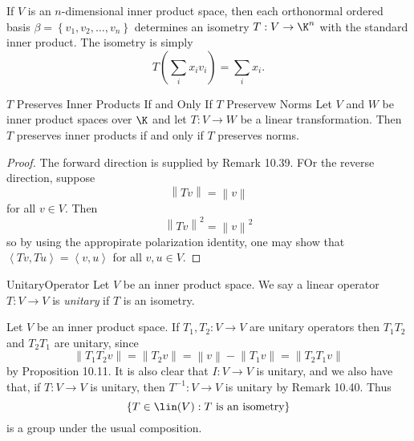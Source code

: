 \documentclass[linearalgebra]{subfiles}
\begin{document}
    \begin{example}
        If $V$ is an $n$-dimensional inner product space, then each orthonormal ordered basis $\beta = \left\lbrace v_1,v_2,\ldots,v_n \right\rbrace$ determines an isometry $T:V\to\K^n$ with the standard inner product. The isometry is simply
        \begin{equation*}
            T\left( \sum^{}_{i} x_iv_i \right) = \sum^{}_{i} x_i.
        \end{equation*}
    \end{example}

    \begin{prop}{$T$ Preserves Inner Products If and Only If $T$ Preservew Norms}
        Let $V$ and $W$ be inner product spaces over $\K$ and let $T:V\to W$ be a linear transformation. Then $T$ preserves inner products if and only if $T$ preserves norms.
    \end{prop}

    \begin{proof}
        The forward direction is supplied by Remark 10.39. FOr the reverse direction, suppose
        \begin{equation*}
            \left\lVert Tv\right\rVert = \left\lVert v\right\rVert 
        \end{equation*}
        for all $v\in V$. Then
        \begin{equation*}
            \left\lVert Tv\right\rVert ^2 = \left\lVert v\right\rVert ^2
        \end{equation*}
        so by using the appropirate polarization identity, one may show that $\left\langle Tv, Tu\right\rangle = \left\langle v, u\right\rangle $ for all $v,u\in V$.
    \end{proof}

    \begin{definition}{Unitary}{Operator}
        Let $V$ be an inner product space. We say a linear operator $T:V\to V$ is \emph{unitary} if $T$ is an isometry.
    \end{definition}

    \begin{remark}
        Let $V$ be an inner product space. If $T_1,T_2:V\to V$ are unitary operators then $T_1T_2$ and $T_2T_1$ are unitary, since
        \begin{equation*}
            \left\lVert T_1T_2v\right\rVert = \left\lVert T_2v\right\rVert = \left\lVert v\right\rVert - \left\lVert T_1v\right\rVert = \left\lVert T_2T_1v\right\rVert 
        \end{equation*}
        by Proposition 10.11. It is also clear that $I:V\to V$ is unitary, and we also have that, if $T:V\to V$ is unitary, then $T^{-1}:V\to V$ is unitary by Remark 10.40. Thus
        \begin{equation*}
            \left\lbrace T\in\lin(V) : T\text{ is an isometry} \right\rbrace 
        \end{equation*}
        is a group under the usual composition.
    \end{remark}
\end{document}
